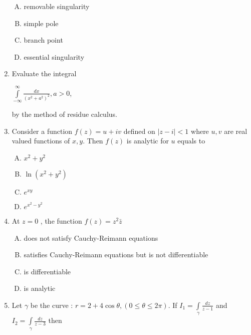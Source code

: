 \documentclass[12pt,a4paper]{article}
\begin{document}
\begin{enumerate}
\begin{enumerate}[(A)]
\item 
removable singularity

\item 
simple pole

\item 
branch point

\item 
essential singularity

\end{enumerate}


\item Evaluate the integral 

$\int\limits_{- \infty}^{\infty} \frac{dx}{{(x^2+a^2)}^2} , a>0 $,

by the method of residue calculus.

\item Consider a function $f(z)=u + iv$ defined on $ \mid z - i \mid < 1 $ where $ u,v $ are real valued functions of $ x,y $. Then $f(z)$ is analytic for $u$ equals to

\begin{enumerate}[(A)]

\item $
x^2+y^2
$

\item $
\ln (x^2+y^2)
$

\item $
e^{xy}
$

\item $
e^{x^2-y^2}
$

\end{enumerate}

\item At $z=0$ , the function $f(z)=z^2\bar{z}$


\begin{enumerate}[(A)]

\item 
does not satisfy Cauchy-Reimann equations

\item 
satisfies Cauchy-Reimann equations but is not differentiable 

\item 
is differentiable

\item 
is analytic

\end{enumerate}

\item Let $\gamma$ be the curve : $ r=2+4 \cos \theta , (0 \leq \theta \leq 2\pi)$. If $ I_{1}=\int\limits_{\gamma} \frac{dz}{z-1}$ and $I_{2}= \int\limits_{\gamma}\frac{dz}{z-3}$ then


\end{enumerate}
\end{document}

